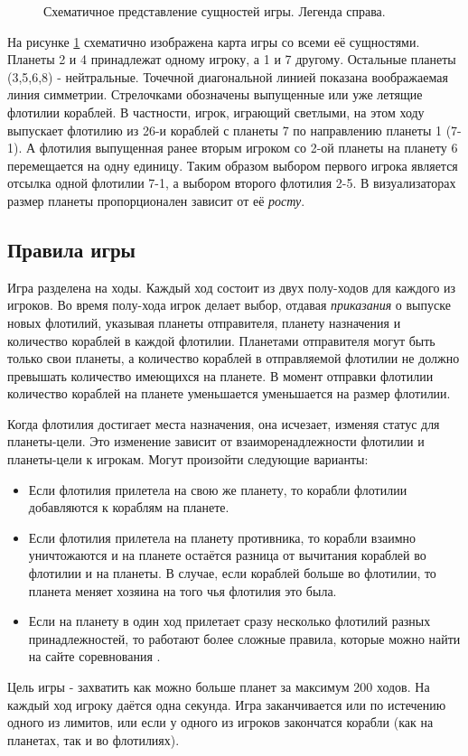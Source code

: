 \documentclass[12pt]{report}
\newenvironment{myItemize}{
	\begin{itemize}
  		\setlength{\itemsep}{1pt}
  		\setlength{\parskip}{0pt}
  		\setlength{\parsep}{0pt}
}{\end{itemize}}
\begin{document}
\begin{figure}[h]
	\centering
	
	\caption{Схематичное представление сущностей игры. Легенда справа.}
	\label{fig:pw_entities}
\end{figure}
На рисунке \ref{fig:pw_entities} схематично изображена карта игры со всеми её сущностями. Планеты 2 и 4 принадлежат одному игроку, а 1 и 7 другому. Остальные планеты (3,5,6,8) - нейтральные. Точечной диагональной линией показана воображаемая линия симметрии. Стрелочками обозначены выпущенные или уже летящие флотилии кораблей. В частности, игрок, играющий светлыми, на этом ходу выпускает флотилию из 26-и кораблей с планеты 7 по направлению планеты 1 (7-1). А флотилия выпущенная ранее вторым игроком со 2-ой планеты на планету 6 перемещается на одну единицу. Таким образом выбором первого игрока является отсылка одной флотилии 7-1, а выбором второго флотилия 2-5. В визуализаторах размер планеты пропорционален зависит от её \emph{росту}.



\subsection{Правила игры}
\label{sec:game_rules}
Игра разделена на ходы. Каждый ход состоит из двух полу-ходов для каждого из игроков. Во время полу-хода игрок делает выбор, отдавая \emph{приказания} о выпуске новых флотилий, указывая планеты отправителя, планету назначения и количество кораблей в каждой флотилии. Планетами отправителя могут быть только свои планеты, а количество кораблей в отправляемой флотилии не должно превышать количество имеющихся на планете. В момент отправки флотилии количество кораблей на планете уменьшается уменьшается на размер флотилии.

Когда флотилия достигает места назначения, она исчезает, изменяя статус для планеты-цели. Это изменение зависит от взаиморенадлежности флотилии и планеты-цели к игрокам. Могут произойти следующие варианты:
\begin{myItemize}
\item Если флотилия прилетела на свою же планету, то корабли флотилии добавляются к кораблям на планете.
\item Если флотилия прилетела на планету противника, то корабли взаимно уничтожаются и на планете остаётся разница от вычитания кораблей во флотилии и на планеты. В случае, если кораблей больше во флотилии, то планета меняет хозяина на того чья флотилия это была.
\item Если на планету в один ход прилетает сразу несколько флотилий разных принадлежностей, то работают более сложные правила, которые можно найти на сайте соревнования \citep{PlanetWarsSpec}.
\end{myItemize}
Цель игры - захватить как можно больше планет за максимум 200 ходов. На каждый ход игроку даётся одна секунда. Игра заканчивается или по истечению одного из лимитов, или если у одного из игроков закончатся корабли (как на планетах, так и во флотилиях). \citep{PlanetWarsSpec}
\end{document}
